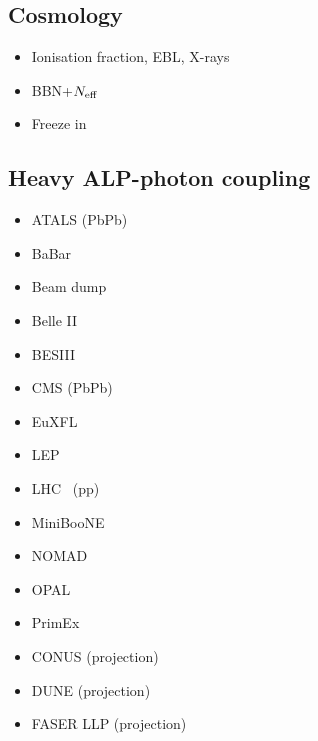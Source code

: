 \documentclass[8pt,twocolumn]{extarticle}
\begin{document}
\begin{mdframed}[everyline=true]
\subsection*{Cosmology}\vspace{-0.5em}
\begin{itemize}\setlength\itemsep{-0.5em}
    \item Ionisation fraction, EBL, X-rays~\cite{Cadamuro:2011fd}
    \item BBN+$N_{\rm eff}$~\cite{Depta:2020wmr}
    \item Freeze in~\cite{Langhoff:2022bij}
\end{itemize}
\end{mdframed}

\begin{mdframed}
\vspace{-1em}
\section{Heavy ALP-photon coupling}\vspace{-0.5em}
\begin{itemize}\setlength\itemsep{-0.5em}
    \item ATALS (PbPb)~\cite{ATLAS:2020hii}
    \item BaBar~\cite{Dolan:2017osp}
    \item Beam dump~\cite{CHARM:1985anb,Riordan:1987aw,Dolan:2017osp,Blumlein:1990ay,NA64:2020qwq}
    \item Belle II~\cite{Belle-II:2020jti}
    \item BESIII~\cite{BESIII:2022rzz}
    \item CMS (PbPb)~\cite{CMS:2018erd}
    \item EuXFL~\cite{Halliday:2024lca}
    \item LEP~\cite{Jaeckel:2015jla}
    \item LHC~ (pp)\cite{Knapen:2016moh}
    \item MiniBooNE~\cite{Capozzi:2023ffu}
    \item NOMAD~\cite{NOMAD:2000usb}
	 \item OPAL~\cite{Knapen:2016moh}
	 \item PrimEx~\cite{PrimEx:2010fvg,Aloni:2019ruo}
	     \item CONUS (projection)~\cite{Dent:2019ueq}
    \item DUNE (projection)~\cite{Brdar:2020dpr}
    \item FASER LLP (projection)~\cite{FASER:2018eoc}
\end{itemize}
\end{mdframed}
\end{document}
